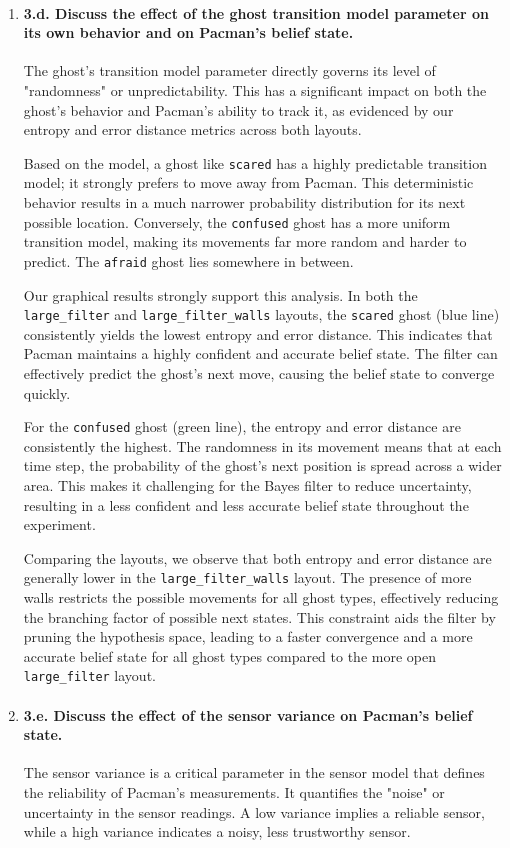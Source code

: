 \documentclass{article}
\begin{document}
\begin{enumerate}[label=\alph*.,leftmargin=*]
    \item \paragraph{3.d. Discuss the effect of the ghost transition model parameter on its own behavior and on Pacman's belief state.}
    The ghost's transition model parameter directly governs its level of "randomness" or unpredictability. This has a significant impact on both the ghost's behavior and Pacman's ability to track it, as evidenced by our entropy and error distance metrics across both layouts.
    
    Based on the model, a ghost like \texttt{scared} has a highly predictable transition model; it strongly prefers to move away from Pacman. This deterministic behavior results in a much narrower probability distribution for its next possible location. Conversely, the \texttt{confused} ghost has a more uniform transition model, making its movements far more random and harder to predict. The \texttt{afraid} ghost lies somewhere in between.
    
    Our graphical results strongly support this analysis. In both the \texttt{large\_filter} and \texttt{large\_filter\_walls} layouts, the \texttt{scared} ghost (blue line) consistently yields the lowest entropy and error distance. This indicates that Pacman maintains a highly confident and accurate belief state. The filter can effectively predict the ghost's next move, causing the belief state to converge quickly.
    
    For the \texttt{confused} ghost (green line), the entropy and error distance are consistently the highest. The randomness in its movement means that at each time step, the probability of the ghost's next position is spread across a wider area. This makes it challenging for the Bayes filter to reduce uncertainty, resulting in a less confident and less accurate belief state throughout the experiment.
    
    Comparing the layouts, we observe that both entropy and error distance are generally lower in the \texttt{large\_filter\_walls} layout. The presence of more walls restricts the possible movements for all ghost types, effectively reducing the branching factor of possible next states. This constraint aids the filter by pruning the hypothesis space, leading to a faster convergence and a more accurate belief state for all ghost types compared to the more open \texttt{large\_filter} layout.

    \item \paragraph{3.e. Discuss the effect of the sensor variance on Pacman's belief state.}
    The sensor variance is a critical parameter in the sensor model that defines the reliability of Pacman's measurements. It quantifies the "noise" or uncertainty in the sensor readings. A low variance implies a reliable sensor, while a high variance indicates a noisy, less trustworthy sensor.
    

\end{enumerate}
\end{document}
